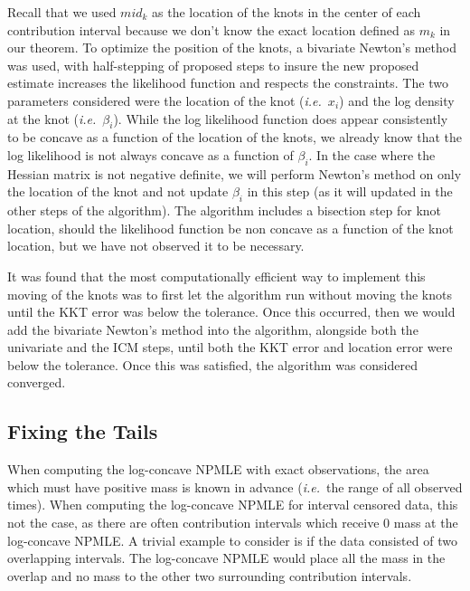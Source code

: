 	Recall that we used $mid_k$ as the location of the knots in the center of each contribution interval because we don't know the exact location defined as $m_k$ in our theorem. To optimize the position of the knots, a bivariate Newton's method was used, with half-stepping of proposed steps to insure the new proposed estimate increases the likelihood function and respects the constraints. The two parameters considered were the location of the knot (\emph{i.e.}\ $x_i$) and the log density at the knot (\emph{i.e.}\ $\beta_i$). While the log likelihood function does appear consistently to be concave as a function of the location of the knots, we already know that the log likelihood is not always concave as a function of $\beta_i$. In the case where the Hessian matrix is not negative definite, we will perform Newton's method on only the location of the knot and not update $\beta_i$ in this step (as it will updated in the other steps of the algorithm). The algorithm includes a bisection step for knot location, should the likelihood function be non concave as a function of the knot location, but we have not observed it to be necessary. 
	
	It was found that the most computationally efficient way to implement this moving of the knots was to first let the algorithm run without moving the knots until the KKT error was below the tolerance. Once this occurred, then we would add the bivariate Newton's method into the algorithm, alongside both the univariate and the ICM steps, until both the KKT error and location error were below the tolerance. Once this was satisfied, the algorithm was considered converged. 
	
		{\subsection{Fixing the Tails} }
	
	When computing the log-concave NPMLE with exact observations, the area which must have positive mass is known in advance (\emph{i.e.}\ the range of all observed times). When computing the log-concave NPMLE for interval censored data, this not the case, as there are often contribution intervals which receive 0 mass at the log-concave NPMLE. A trivial example to consider is if the data consisted of two overlapping intervals. The log-concave NPMLE would place all the mass in the overlap and no mass to the other two surrounding contribution intervals.%
	 		

